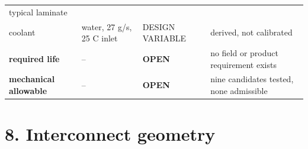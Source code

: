\documentclass[10pt,]{article}
\begin{document}
\begin{longtable}[]{@{}llll@{}}
\begin{minipage}[t]{0.22\columnwidth}
typical laminate\strut
\end{minipage}\tabularnewline
\begin{minipage}[t]{0.22\columnwidth}\raggedright
coolant\strut
\end{minipage} & \begin{minipage}[t]{0.22\columnwidth}\raggedright
water, 27 g/s, 25 C inlet\strut
\end{minipage} & \begin{minipage}[t]{0.22\columnwidth}\raggedright
DESIGN VARIABLE\strut
\end{minipage} & \begin{minipage}[t]{0.22\columnwidth}\raggedright
derived, not calibrated\strut
\end{minipage}\tabularnewline
\begin{minipage}[t]{0.22\columnwidth}\raggedright
\textbf{required life}\strut
\end{minipage} & \begin{minipage}[t]{0.22\columnwidth}\raggedright
--\strut
\end{minipage} & \begin{minipage}[t]{0.22\columnwidth}\raggedright
\textbf{OPEN}\strut
\end{minipage} & \begin{minipage}[t]{0.22\columnwidth}\raggedright
no field or product requirement exists\strut
\end{minipage}\tabularnewline
\begin{minipage}[t]{0.22\columnwidth}\raggedright
\textbf{mechanical allowable}\strut
\end{minipage} & \begin{minipage}[t]{0.22\columnwidth}\raggedright
--\strut
\end{minipage} & \begin{minipage}[t]{0.22\columnwidth}\raggedright
\textbf{OPEN}\strut
\end{minipage} & \begin{minipage}[t]{0.22\columnwidth}\raggedright
nine candidates tested, none admissible\strut
\end{minipage}\tabularnewline
\bottomrule
\end{longtable}

\newpage

\hypertarget{interconnect-geometry}{%
\section{8. Interconnect geometry}\label{interconnect-geometry}}
\end{document}
